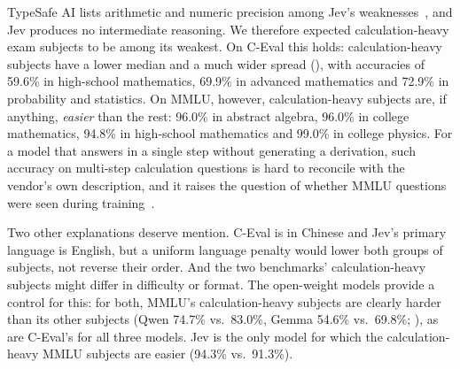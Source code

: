 \documentclass[table]{article}
\begin{document}
TypeSafe AI lists arithmetic and numeric precision among Jev's weaknesses~\cite{typesafe2026jev}, and Jev produces no intermediate reasoning. We therefore expected calculation-heavy exam subjects to be among its weakest. On C-Eval this holds: calculation-heavy subjects have a lower median and a much wider spread (), with accuracies of 59.6\% in high-school mathematics, 69.9\% in advanced mathematics and 72.9\% in probability and statistics. On MMLU, however, calculation-heavy subjects are, if anything, \emph{easier} than the rest: 96.0\% in abstract algebra, 96.0\% in college mathematics, 94.8\% in high-school mathematics and 99.0\% in college physics. For a model that answers in a single step without generating a derivation, such accuracy on multi-step calculation questions is hard to reconcile with the vendor's own description, and it raises the question of whether MMLU questions were seen during training~\cite{sainz-etal-2023-nlp}.

Two other explanations deserve mention. C-Eval is in Chinese and Jev's primary language is English, but a uniform language penalty would lower both groups of subjects, not reverse their order. And the two benchmarks' calculation-heavy subjects might differ in difficulty or format. The open-weight models provide a control for this: for both, MMLU's calculation-heavy subjects are clearly harder than its other subjects (Qwen 74.7\% vs.\ 83.0\%, Gemma 54.6\% vs.\ 69.8\%; ), as are C-Eval's for all three models. Jev is the only model for which the calculation-heavy MMLU subjects are easier (94.3\% vs.\ 91.3\%).

\begin{table}[t]
\centering
\caption{Calculation-heavy vs.\ other subjects of MMLU and C-Eval for each model: accuracy with the original requests, and on the calculation-heavy subjects with the answer options rotated so that every option changes its letter, and with the question withheld (only the subject and the options are shown). Chance is 0.25.}
\label{tab:probes}
\footnotesize
\setlength{\tabcolsep}{4pt}

\end{table}
\end{document}
